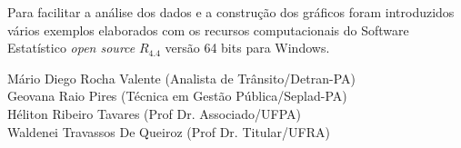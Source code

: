 Para facilitar a análise dos dados e a construção dos gráficos foram introduzidos vários exemplos elaborados com os recursos computacionais do Software Estatístico \textit{open source} \textbf{$R_{4.4}$} versão 64 bits para Windows. 
\vst






\vst
\vst
\vst

\begin{centering}

\vst

\vsm

Mário Diego Rocha Valente (Analista de Trânsito/Detran-PA) \\
Geovana Raio Pires (Técnica em Gestão Pública/Seplad-PA)\\
Héliton Ribeiro Tavares (Prof Dr. Associado/UFPA)\\
Waldenei Travassos De Queiroz (Prof Dr. Titular/UFRA)\\



\end{centering}
